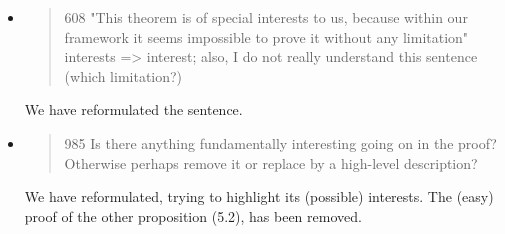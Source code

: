 \begin{itemize}



  \item \begin{quote}
608 "This theorem is of special interests to us, because within our framework it seems impossible to prove it without any limitation" interests => interest; also, I do not really understand this sentence (which limitation?)
\end{quote}
  \Mark We have reformulated the sentence. 


  \item \begin{quote}
985 Is there anything fundamentally interesting going on in the proof? Otherwise perhaps remove it or replace by a high-level description?
\end{quote}
  \Mark 
We have reformulated, trying to highlight its (possible)
interests. The (easy) proof of the other proposition (5.2), has been removed.



\end{itemize}
